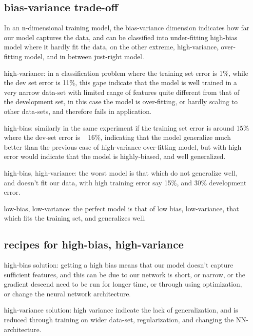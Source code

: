 \documentclass[4apaper,12pt]{book}
\begin{document}
\begin{description}
  \subsection{bias-variance trade-off}
\item In an n-dimensional training model, the bias-variance dimension indicates how far our model captures the data, and can be classified into under-fitting high-bias model where it hardly fit the data, on the other extreme, high-variance, over-fitting model, and in between just-right model.
\item high-variance: in a classification problem where the training set error is 1\%, while the dev set error is 11\%, this gape indicate that the model is well trained in a very narrow data-set with limited range of features quite different from that of the development set, in this case the model is over-fitting, or hardly scaling to other data-sets, and therefore fails in application.
\item high-bias: similarly in the same experiment if the training set error is around 15\% where the dev-set error is ~ 16\%, indicating that the model generalize much better than the previous case of high-variance over-fitting model, but with high error would indicate that the model is highly-biased, and well generalized.
\item high-bias, high-variance: the worst model is that which do not generalize well, and doesn't fit our data, with high training error say 15\%, and 30\% development error.
\item low-bias, low-variance: the perfect model is that of low bias, low-variance, that which fits the training set, and generalizes well.
  \subsection{recipes for high-bias, high-variance}
\item high-bias solution: getting a high bias means that our model doesn't capture sufficient features, and this can be due to  our network is short, or narrow, or the gradient descend need to be run for longer time, or through using optimization, or change the neural network architecture.
\item high-variance solution: high variance indicate the lack of generalization, and is reduced through training on wider data-set, regularization, and changing the NN-architecture.


\end{description}
\end{document}

